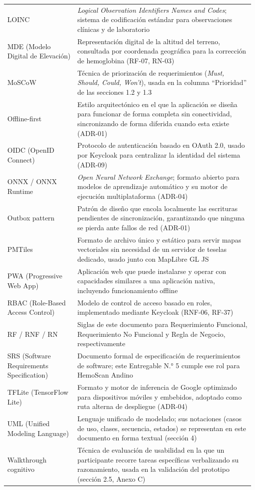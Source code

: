 \documentclass[11pt,a4paper]{article}
\begin{document}
{\begin{longtable}[]{@{}
  >{\raggedright\arraybackslash}p{}
  >{\raggedright\arraybackslash}p{}@{}}
LOINC & \emph{Logical Observation Identifiers Names and Codes}; sistema de codificación estándar para observaciones clínicas y de laboratorio \\
MDE (Modelo Digital de Elevación) & Representación digital de la altitud del terreno, consultada por coordenada geográfica para la corrección de hemoglobina (RF-07, RN-03) \\
MoSCoW & Técnica de priorización de requerimientos (\emph{Must, Should, Could, Won't}), usada en la columna ``Prioridad'' de las secciones 1.2 y 1.3 \\
Offline-first & Estilo arquitectónico en el que la aplicación se diseña para funcionar de forma completa sin conectividad, sincronizando de forma diferida cuando esta existe (ADR-01) \\
OIDC (OpenID Connect) & Protocolo de autenticación basado en OAuth 2.0, usado por Keycloak para centralizar la identidad del sistema (ADR-09) \\
ONNX / ONNX Runtime & \emph{Open Neural Network Exchange}; formato abierto para modelos de aprendizaje automático y su motor de ejecución multiplataforma (ADR-04) \\
Outbox pattern & Patrón de diseño que encola localmente las escrituras pendientes de sincronización, garantizando que ninguna se pierda ante fallos de red (ADR-01) \\
PMTiles & Formato de archivo único y estático para servir mapas vectoriales sin necesidad de un servidor de teselas dedicado, usado junto con MapLibre GL JS \\
PWA (Progressive Web App) & Aplicación web que puede instalarse y operar con capacidades similares a una aplicación nativa, incluyendo funcionamiento offline \\
RBAC (Role-Based Access Control) & Modelo de control de acceso basado en roles, implementado mediante Keycloak (RNF-06, RF-37) \\
RF / RNF / RN & Siglas de este documento para Requerimiento Funcional, Requerimiento No Funcional y Regla de Negocio, respectivamente \\
SRS (Software Requirements Specification) & Documento formal de especificación de requerimientos de software; este Entregable N.° 5 cumple ese rol para HemoScan Andino \\
TFLite (TensorFlow Lite) & Formato y motor de inferencia de Google optimizado para dispositivos móviles y embebidos, adoptado como ruta alterna de despliegue (ADR-04) \\
UML (Unified Modeling Language) & Lenguaje unificado de modelado; sus notaciones (casos de uso, clases, secuencia, estados) se representan en este documento en forma textual (sección 4) \\
Walkthrough cognitivo & Técnica de evaluación de usabilidad en la que un participante recorre tareas específicas verbalizando su razonamiento, usada en la validación del prototipo (sección 2.5, Anexo C) \\
\end{longtable}
}
\end{document}
